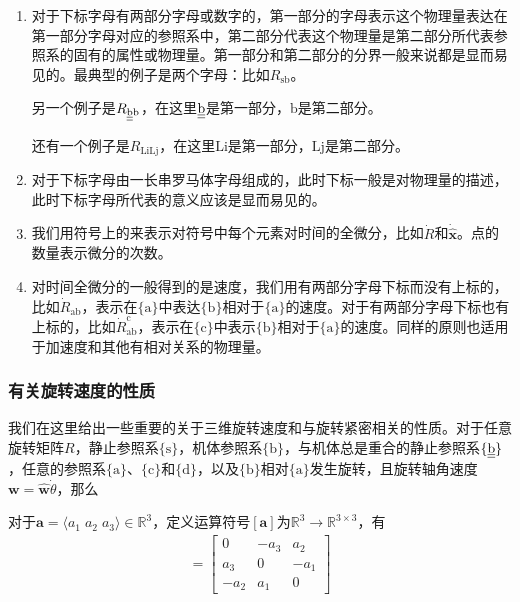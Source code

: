 \documentclass[12pt, a4paper, article, UTF8]{ctexart}
\begin{document}
\begin{enumerate}
第二种：表示这个物理量是字母所代表的东西中的一个固有属性或物理量，比如$\hat{\mathbf{x}}_\text{b}$，代表$\{\text{b}\}$的x轴，在这里并强调x轴是个单元向量。
对于第一种与第二种的区分，结合上下文应该是显而易见的。

\item 对于下标字母有两部分字母或数字的，第一部分的字母表示这个物理量表达在第一部分字母对应的参照系中，第二部分代表这个物理量是第二部分所代表参照系的固有的属性或物理量。第一部分和第二部分的分界一般来说都是显而易见的。最典型的例子是两个字母：比如$R_\text{sb}$。

另一个例子是$R_\text{\underline{\underline{b}}b}$，在这里$\text{\underline{\underline{b}}}$是第一部分，$\text{b}$是第二部分。

还有一个例子是$R_\text{LiLj}$，在这里$\text{Li}$是第一部分，$\text{Lj}$是第二部分。

\item 对于下标字母由一长串罗马体字母组成的，此时下标一般是对物理量的描述，此时下标字母所代表的意义应该是显而易见的。

\item 我们用符号上的$\dot{}$来表示对符号中每个元素对时间的全微分，比如$\dot{R}$和$\dot{\hat{\mathbf{x}}}$。点的数量表示微分的次数。

\item 对时间全微分的一般得到的是速度，我们用有两部分字母下标而没有上标的，比如$\dot{R}_\text{ab}$，表示在$\{\text{a}\}$中表达$\{\text{b}\}$相对于$\{\text{a}\}$的速度。对于有两部分字母下标也有上标的，比如$\dot{R}_\text{ab}^{\text{c}}$，表示在$\{\text{c}\}$中表示$\{\text{b}\}$相对于$\{\text{a}\}$的速度。同样的原则也适用于加速度和其他有相对关系的物理量。
\end{enumerate}

\subsubsection{有关旋转速度的性质}
我们在这里给出一些重要的关于三维旋转速度和与旋转紧密相关的性质。对于任意旋转矩阵$R$，静止参照系$\{\text{s}\}$，机体参照系$\{\text{b}\}$，与机体总是重合的静止参照系$\{\text{\underline{\underline{b}}}\}$，任意的参照系$\{\text{a}\}$、$\{\text{c}\}$和$\{\text{d}\}$，以及$\{\text{b}\}$相对$\{\text{a}\}$发生旋转，且旋转轴角速度$\mathbf{w}=\hat{\mathbf{w}}\dot{\theta}$，那么

\begin{mydefinition}
对于$\mathbf{a}=\langle a_1 \; a_2 \;a_3\rangle\in\mathbb{R}^3$，定义运算符号$[\mathbf{a}]$为$\mathbb{R}^3\rightarrow \mathbb{R}^{3\times 3}$，有
\begin{align}
[\mathbf{a}] = \begin{bmatrix}
0 & -a_3 & a_2 \\
a_3 & 0 & -a_1\\
-a_2 & a_1 & 0
\end{bmatrix}
\end{align} \label{def:skewsymmetric}
\end{mydefinition}
\end{document}
